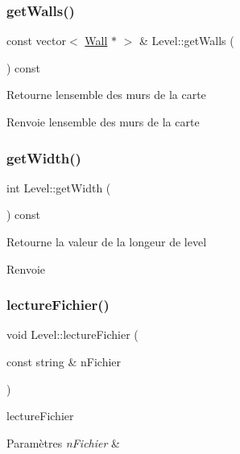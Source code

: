 \subsubsection{\texorpdfstring{getWalls()}{getWalls()}}
{\footnotesize\ttfamily const vector$<$ \mbox{\hyperlink{class_wall}{Wall}} $\ast$ $>$ \& Level\+::get\+Walls (\begin{DoxyParamCaption}{ }\end{DoxyParamCaption}) const}

Retourne l\textquotesingle{}ensemble des murs de la carte \begin{DoxyReturn}{Renvoie}
l\textquotesingle{}ensemble des murs de la carte 
\end{DoxyReturn}
\mbox{\label{class_level_a7195ddd0c73216532169a1f013513cda}} 
\subsubsection{\texorpdfstring{getWidth()}{getWidth()}}
{\footnotesize\ttfamily int Level\+::get\+Width (\begin{DoxyParamCaption}{ }\end{DoxyParamCaption}) const}

Retourne la valeur de la longeur de level \begin{DoxyReturn}{Renvoie}

\end{DoxyReturn}
\mbox{\label{class_level_a97fbfd21ea5677fe64fa8c7add169fff}} 
\subsubsection{\texorpdfstring{lectureFichier()}{lectureFichier()}}
{\footnotesize\ttfamily void Level\+::lecture\+Fichier (\begin{DoxyParamCaption}\item[{const string \&}]{n\+Fichier }\end{DoxyParamCaption})}



lecture\+Fichier 


\begin{DoxyParams}{Paramètres}
{\em n\+Fichier} & \\
\hline
\end{DoxyParams}
\mbox{\label{class_level_a49042f37e8ab0d6a8db43419783136fe}} 
